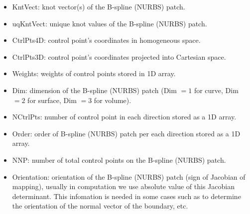 \begin{itemize}
    \item KntVect: knot vector(s) of the B-spline (NURBS) patch.
    \item uqKntVect: unique knot values of the B-spline (NURBS) patch.
    \item CtrlPts4D: control point's coordinates in homogeneous space.
    \item CtrlPts3D: control point's coordinates projected into Cartesian space.
    \item Weights: weights of control points stored in 1D array.
    \item Dim: dimension of the B-spline (NURBS) patch (Dim $= 1$ for curve, Dim $= 2$ for surface, Dim $= 3$ for volume).
    \item NCtrlPts: number of control point in each direction stored as a 1D array.
    \item Order: order of B-spline (NURBS) patch per each direction stored as a 1D array.
    \item NNP: number of total control points on the B-spline (NURBS) patch.
    \item Orientation: orientation of the B-spline (NURBS) patch (sign of Jacobian of mapping), usually in computation we use absolute value of this Jacobian determinant. This infomation is needed in some cases such as to determine the orientation of the normal vector of the boundary, etc.
\end{itemize}
